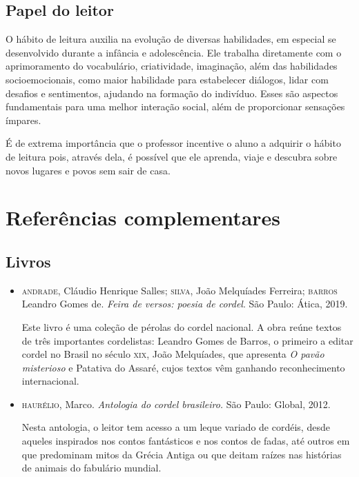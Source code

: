 \documentclass[12pt]{extarticle}
\begin{document}
{\subsection{Papel do leitor}

O hábito de leitura auxilia na evolução de diversas habilidades, em
especial se desenvolvido durante a infância e adolescência. Ele trabalha
diretamente com o aprimoramento do vocabulário, criatividade,
imaginação, além das habilidades socioemocionais, como maior habilidade
para estabelecer diálogos, lidar com desafios e sentimentos, ajudando na
formação do indivíduo. Esses são aspectos fundamentais para uma melhor
interação social, além de proporcionar sensações ímpares.

É de extrema importância que o professor incentive o aluno a adquirir o
hábito de leitura pois, através dela, é possível que ele aprenda, viaje
e descubra sobre novos lugares e povos sem sair de casa.

\section{Referências complementares}

\subsection{Livros}

\begin{itemize}
\item\textsc{andrade}, Cláudio Henrique Salles; \textsc{silva}, João Melquíades Ferreira;   \textsc{barros} Leandro Gomes de. \textit{Feira de versos: poesia de cordel}.
  São Paulo: Ática, 2019.
  
Este livro é uma coleção de pérolas do cordel nacional. A obra reúne
textos de três importantes cordelistas: Leandro Gomes de Barros, o
primeiro a editar cordel no Brasil no século \textsc{xix}, João Melquíades, que
apresenta \emph{O pavão misterioso} e Patativa do Assaré, cujos textos
vêm ganhando reconhecimento internacional.

\item\textsc{haurélio}, Marco. \textit{Antologia do cordel brasileiro.} São Paulo:
  Global, 2012.

Nesta antologia, o leitor tem acesso a um leque variado de cordéis,
desde aqueles inspirados nos contos fantásticos e nos contos de fadas,
até outros em que predominam mitos da Grécia Antiga ou que deitam raízes
nas histórias de animais do fabulário mundial.


\end{itemize}}
\end{document}
